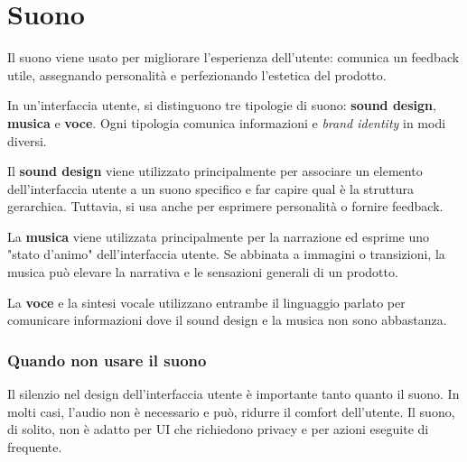 \documentclass[12pt, a4paper]{report}
\begin{document}
   \section{Suono}
   	    Il suono viene usato per migliorare l'esperienza dell'utente: comunica un feedback utile, assegnando personalità e
   	    perfezionando l’estetica del prodotto.

   	    In un'interfaccia utente, si distinguono tre tipologie di suono: \textbf{sound design}, \textbf{musica} e \textbf{voce}. Ogni tipologia comunica informazioni e \textit{brand identity} in modi diversi.

   	    Il \textbf{sound design} viene utilizzato principalmente per associare un elemento dell'interfaccia utente a un suono specifico e far capire qual è la struttura gerarchica.
		Tuttavia, si usa anche per esprimere personalità o fornire feedback.


        La \textbf{musica} viene utilizzata principalmente per la narrazione ed esprime uno "stato d'animo" dell'interfaccia utente.
        Se abbinata a immagini o transizioni, la musica può elevare la narrativa e le sensazioni generali di un prodotto.



        La \textbf{voce} e la sintesi vocale utilizzano entrambe il linguaggio parlato per comunicare informazioni dove il sound
        design e la musica non sono abbastanza.

        \subsubsection{Quando non usare il suono}
                	Il silenzio nel design dell'interfaccia utente è importante tanto quanto il suono. In molti casi, l’audio non è necessario e può,
                    ridurre il comfort dell'utente. Il suono, di solito, non è adatto per UI che richiedono privacy e per azioni eseguite di frequente.
\end{document}
